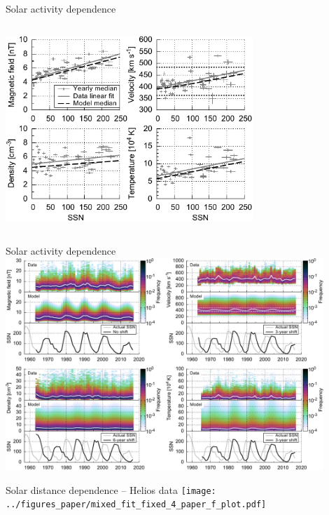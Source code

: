 \begin{frame}[plain,c]{Solar activity dependence}{}
	\begin{columns}[c]
	\column{\textwidth}
		
		\centering
		\includegraphics[width=0.7\textwidth]{../figures_paper/OMNI_yearly_BVNTvsSSN_a.pdf}
		
	\end{columns}
\end{frame}
\begin{frame}[plain,c]{Solar activity dependence}{}
	\centering
	\includegraphics[width=0.9\textwidth]{../figures_paper/OMNI_yearly_BVdblNTSSN_fit_e_plot.pdf}
\end{frame}
\begin{frame}[plain,c]{Solar distance dependence -- Helios data}{}
	\centering
	\texttt{[image: ../figures\_paper/mixed\_fit\_fixed\_4\_paper\_f\_plot.pdf]}
\end{frame}

